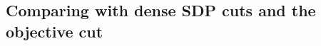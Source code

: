 \documentclass[twoside]{article}
\newcommand{\ns}[1]{\makebox[2em][r]{\,(#1)}}   %
\begin{document}
	
	\subsection{Comparing with dense SDP cuts and the objective cut} 
	\label{sec:SDP_Obj_Cut}
	
\end{document}

